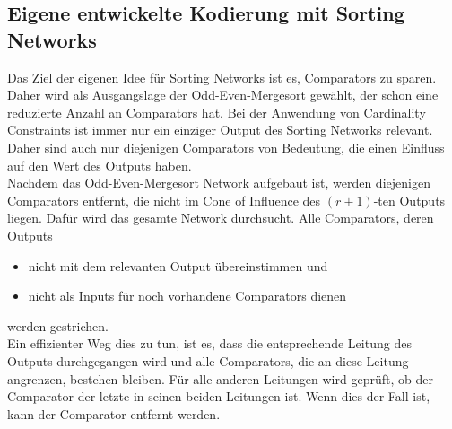 \documentclass[a4,abstract=on]{scrartcl}
\begin{document}
	\subsection{Eigene entwickelte Kodierung mit Sorting Networks}
Das Ziel der eigenen Idee für Sorting Networks ist es, Comparators zu sparen. Daher wird als Ausgangslage der Odd-Even-Mergesort gewählt, der schon eine reduzierte Anzahl an Comparators hat. Bei der Anwendung von Cardinality Constraints ist immer nur ein einziger Output des Sorting Networks relevant. Daher sind auch nur diejenigen Comparators von Bedeutung, die einen Einfluss auf den Wert des Outputs haben.\\
Nachdem das Odd-Even-Mergesort Network aufgebaut ist, werden diejenigen Comparators entfernt, die nicht im Cone of Influence des $(r+1)$-ten Outputs liegen. Dafür wird das gesamte Network durchsucht. Alle Comparators, deren Outputs
\begin{itemize}
\item nicht mit dem relevanten Output übereinstimmen und
\item nicht als Inputs für noch vorhandene Comparators dienen
\end{itemize}
werden gestrichen. \\
Ein effizienter Weg dies zu tun, ist es, dass die entsprechende Leitung des Outputs durchgegangen wird und alle Comparators, die an diese Leitung angrenzen, bestehen bleiben. Für alle anderen Leitungen wird geprüft, ob der Comparator der letzte in seinen beiden Leitungen ist. Wenn dies der Fall ist, kann der Comparator entfernt werden.

\end{document}
